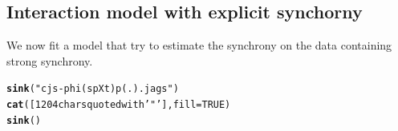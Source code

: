 \documentclass[a4paper, 10pt]{scrartcl}\usepackage[]{graphicx}\usepackage[]{color}
\makeatletter
\newcommand{\hlnum}[1]{\textcolor[rgb]{0.686,0.059,0.569}{#1}}%
\newcommand{\hlstr}[1]{\textcolor[rgb]{0.192,0.494,0.8}{#1}}%
\newcommand{\hlstd}[1]{\textcolor[rgb]{0.345,0.345,0.345}{#1}}%
\newcommand{\hlkwc}[1]{\textcolor[rgb]{0.333,0.667,0.333}{#1}}%
\newcommand{\hlkwd}[1]{\textcolor[rgb]{0.737,0.353,0.396}{\textbf{#1}}}%
\newenvironment{kframe}{%
 \def\at@end@of@kframe{}%
 \ifinner\ifhmode%
  \def\at@end@of@kframe{\end{minipage}}%
  \begin{minipage}{\columnwidth}%
 \fi\fi%
 \def\FrameCommand##1{\hskip\@totalleftmargin \hskip-\fboxsep
 \colorbox{shadecolor}{##1}\hskip-\fboxsep
     \hskip-\linewidth \hskip-\@totalleftmargin \hskip\columnwidth}%
 \MakeFramed {\advance\hsize-\width
   \@totalleftmargin\z@ \linewidth\hsize
   \@setminipage}}%
 {\par\unskip\endMakeFramed%
 \at@end@of@kframe}
\newenvironment{knitrout}{}{} %
\makeatother
\begin{document}
\subsection{Interaction model with explicit synchorny}
We now fit a model that try to estimate the synchrony on the data containing strong synchrony.

\begin{knitrout}
\color{fgcolor}\begin{kframe}
\begin{alltt}
\hlkwd{sink}\hlstd{(}\hlstr{"cjs-phi(spXt)p(.).jags"}\hlstd{)}
\hlkwd{cat}\hlstd{(}\hlstr{[1204 chars quoted with '"']}\hlstd{,}\hlkwc{fill} \hlstd{=} \hlnum{TRUE}\hlstd{)}
\hlkwd{sink}\hlstd{()}
\end{alltt}
\end{kframe}
\end{knitrout}
\end{document}
